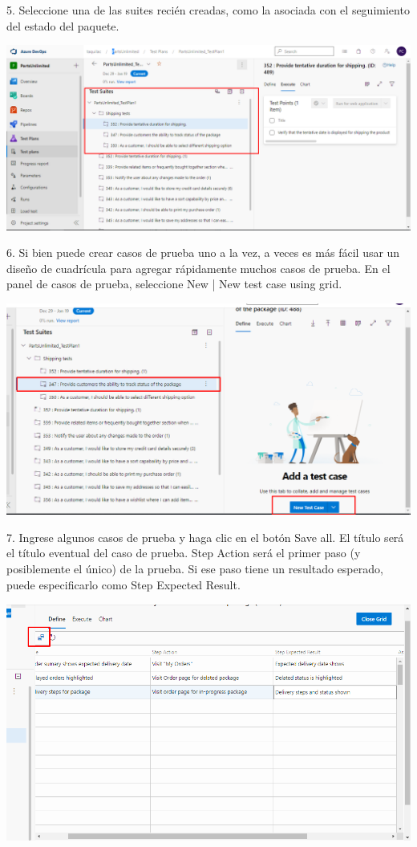 \documentclass[12pt,letterpaper]{article}
\begin{document}
5. Seleccione una de las suites recién creadas, como la asociada con el seguimiento del estado del paquete.

\begin{center}
		\includegraphics[width=15cm]{./Imagenes/33} 
\end{center}

6. Si bien puede crear casos de prueba uno a la vez, a veces es más fácil usar un diseño de cuadrícula para agregar rápidamente muchos casos de prueba. En el panel de casos de prueba, seleccione New | New test case using grid.

\begin{center}
		\includegraphics[width=15cm]{./Imagenes/34} 
\end{center}

7. Ingrese algunos casos de prueba y haga clic en el botón Save all. El título será el título eventual del caso de prueba. Step Action será el primer paso (y posiblemente el único) de la prueba. Si ese paso tiene un resultado esperado, puede especificarlo como Step Expected Result.

\begin{center}
		\includegraphics[width=15cm]{./Imagenes/35} 
\end{center}
\end{document}
